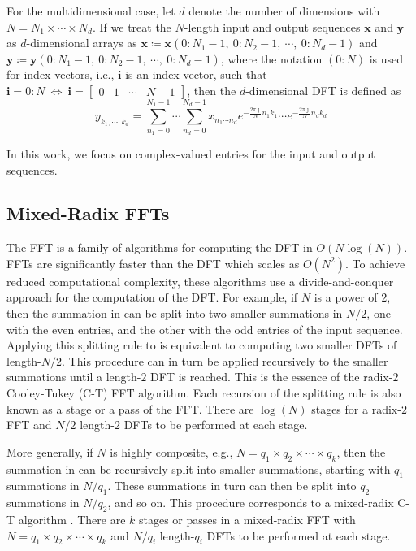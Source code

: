 \documentclass[11pt, onecolumn, journal,compsoc]{IEEEtran}
\theoremstyle{problemstyle}
\begin{document}
For the multidimensional case, let $d$ denote the number of dimensions with $N=N_1 \times \cdots \times N_d$. If we treat the $N$-length input and output sequences $\bm{x}$ and $\bm{y}$ as $d$-dimensional arrays as $\bm{x} \coloneq \bm{x}(0 \colon N_1-1,\ 0 \colon N_2-1, \ \cdots,\ 0 \colon N_d-1)$ and $\bm{y} \coloneq \bm{y}(0 \colon N_1-1,\ 0\colon N_2-1, \ \cdots,\ 0 \colon N_d-1)$, where the notation $(0 \colon N)$ is used for index vectors, i.e., $\bm{i}$ is an index vector, such that $\bm{i}=0 \colon N \ \Leftrightarrow \ \bm{i}=\begin{bmatrix} 0 & 1 & \cdots & N-1 \end{bmatrix}$, then the $d$-dimensional DFT is defined as
\begin{equation}
y_{k_1, \cdots, k_d} = \sum_{n_1=0}^{N_1-1}{\cdots}\sum_{n_d=0}^{N_d-1}{x_{n_1 \cdots n_d} e^{-\frac{2 \pi \jmath}{N}n_1k_1} \cdots e^{-\frac{2 \pi \jmath}{N}n_d k_d}}
\label{eq:multi_dimdft}
\end{equation}

In this work, we focus on complex-valued entries for the input and output sequences. 
\subsection{Mixed-Radix FFTs}
The FFT is a family of algorithms for computing the DFT in $O(N \log(N))$. FFTs are significantly faster than the DFT which scales as $O(N^2)$. To achieve reduced computational complexity, these algorithms use a divide-and-conquer approach for the computation of the DFT. For example, if $N$ is a power of $2$, then the summation in  can be split into two smaller summations in $N/2$, one with the even entries, and the other with the odd entries of the input sequence. Applying this splitting rule to  is equivalent to computing two smaller DFTs of length-$N/2$. This procedure can in turn be applied recursively to the smaller summations until a length-$2$ DFT is reached. This is the essence of the radix-$2$ Cooley-Tukey (C-T) FFT algorithm. Each recursion of the splitting rule is also known as a stage or a pass of the FFT. There are $\log(N)$ stages for a radix-$2$ FFT and $N/2$ length-$2$ DFTs to be performed at each stage.	

More generally, if $N$ is highly composite, e.g., $N=q_1 \times q_2 \times \cdots \times q_k$, then the summation in  can be recursively split into smaller summations, starting with $q_1$ summations in $N/q_1$. These summations in turn can then be split into $q_2$ summations in $N/q_2$, and so on. This procedure corresponds to a mixed-radix C-T algorithm \cite{vanloan92}. There are $k$ stages or passes in a mixed-radix FFT with $N=q_1 \times q_2 \times \cdots \times q_k$ and $N/q_i$ length-$q_i$ DFTs to be performed at each stage. 
\end{document}
